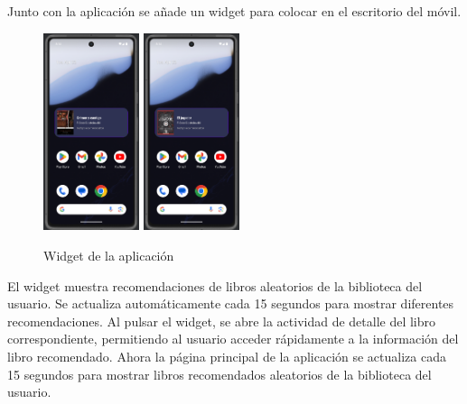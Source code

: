 \documentclass[a4paper,11pt]{report}
\begin{document}
      Junto con la aplicación se añade un widget para colocar en el escritorio del móvil.
      \begin{figure}[H]
        \centering
        \includegraphics[width=0.25\textwidth]{.img/widget.png}
        \hspace{2cm}
        \includegraphics[width=0.25\textwidth]{.img/widget_2.png}
        \caption{Widget de la aplicación}
        \label{fig:widget}
      \end{figure}
      El widget muestra recomendaciones de libros aleatorios de la biblioteca del usuario. Se actualiza automáticamente cada 15 segundos para mostrar diferentes recomendaciones.
      Al pulsar el widget, se abre la actividad de detalle del libro correspondiente, permitiendo al usuario acceder rápidamente a la información del libro recomendado.
      Ahora la página principal de la aplicación se actualiza cada 15 segundos para mostrar libros recomendados aleatorios de la biblioteca del usuario.
\end{document}

